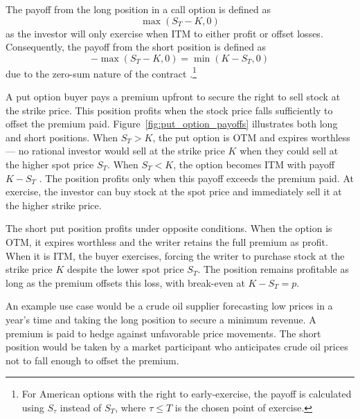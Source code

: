 \documentclass[english,12pt,a4paper,pdftex,sci,utf8]{aaltothesis}
\begin{document}
The payoff from the long position in a call option is defined as
\begin{equation}
    \max(S_T-K,0)
\label{eq:long_call_payoff}
\end{equation}
as the investor will only exercise when ITM to either profit or offset losses. Consequently, the payoff from the short position is defined as 
\begin{equation*}
    -\max(S_T-K,0) = \min(K-S_T,0)
\end{equation*}
due to the zero-sum nature of the contract \cite{hull2016options}.\footnote{For American options with the right to early-exercise, the payoff is calculated using $S_\tau$ instead of $S_T$, where $\tau \le T$ is the chosen point of exercise.}

A put option buyer pays a premium upfront to secure the right to sell stock at the strike price. This position profits when the stock price falls sufficiently to offset the premium paid. Figure~\ref{fig:put_option_payoffs} illustrates both long and short positions. When $S_T > K$, the put option is OTM and expires worthless --- no rational investor would sell at the strike price $K$ when they could sell at the higher spot price $S_T$. When $S_T < K$, the option becomes ITM with payoff $K - S_T$ \cite{hull2013fundamentals}. The position profits only when this payoff exceeds the premium paid. At exercise, the investor can buy stock at the spot price and immediately sell it at the higher strike price.

The short put position profits under opposite conditions. When the option is OTM, it expires worthless and the writer retains the full premium as profit. When it is ITM, the buyer exercises, forcing the writer to purchase stock at the strike price $K$ despite the lower spot price $S_T$. The position remains profitable as long as the premium offsets this loss, with break-even at $K - S_T = p$.

An example use case would be a crude oil supplier forecasting low prices in a year's time and taking the long position to secure a minimum revenue. A premium is paid to hedge against unfavorable price movements. The short position would be taken by a market participant who anticipates crude oil prices not to fall enough to offset the premium.
\end{document}
